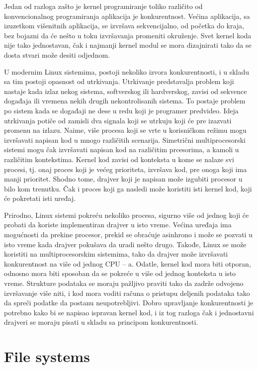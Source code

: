 \documentclass[a4paper, 12pt, diplomski]{etf}
\begin{document}
	Jedan od razloga zašto je kernel programiranje toliko različito od konvencionalnog programiranja aplikacija je konkurentnost. Većina aplikacija, sa izuzetkom višenitnih aplikacija, se izvršava sekvencijalno, od početka do kraja, bez bojazni da će nešto u toku izvršavanja promeniti okruženje. Svet kernel koda nije tako jednostavan, čak i najmanji kernel modul se mora dizajnirati tako da se dosta stvari može desiti odjednom.

	U modernim Linux sistemima, postoji nekoliko izvora konkurentnosti, i u skladu sa tim postoji opasnost od utrkivanja. Utrkivanje predstavalja problem koji nastaje kada izlaz nekog sistema, softverskog ili hardverskog, zavisi od sekvence događaja ili vremena nekih drugih nekontrolisanih sistema. To postaje problem po sistem kada se događaji ne dese u redu koji je programer predvideo. Ideja utrkivanja potiče od zamisli dva signala koji se utrkuju koji će pre izazvati promenu na izlazu. Naime, više procesa koji se vrte u korisničkom režimu mogu izvršavati napisan kod u mnogo različitih scenarija. Simetrični multiprocesorski sistemi mogu čak izvršavati napisan kod na različitim prcesorima, a kamoli u različitim kontekstima.  Kernel kod zavisi od konteksta u kome se nalaze svi procesi, tj. onaj proces koji je većeg prioriteta, izvršava kod, pre onoga koji ima manji prioritet. Shodno tome, drajver koji je napisan može izgubiti procesor u bilo kom trenutku. Čak i proces koji ga nasledi može koristiti isti kernel kod, koji će pokretati isti uređaj.

	Prirodno, Linux sistemi pokreću nekoliko procesa, sigurno više od jednog koji će probati da koriste implementiran drajver u isto vreme. Većina uređaja ima mogućnosti da prekine procesor, prekid se obraćuje asinhrono i može se pozvati u isto vreme kada drajver pokušava da uradi nešto drugo. Takođe, Linux se može koristiti na multiprocesorskim sistemima, tako da drajver može izvršavati konkurentnost na više od jednog CPU – a. Odatle, kernel kod mora biti otporan, odnosno mora biti sposoban da se pokreće u više od jednog konteksta u isto vreme. Strukture podataka se moraju pažljivo praviti tako da zadrže odvojeno izvršavanje više niti, i kod mora voditi računa o pristupu deljenih podataka tako da spreči podatke da postanu neupotrebljivi. Dobro upravljanje konkurentnosti je potrebno kako bi se napisao ispravan kernel kod, i iz tog razloga čak i jednostavni drajveri se moraju pisati u skladu sa principom konkurentnosti.

	\section{File systems}
\end{document}

